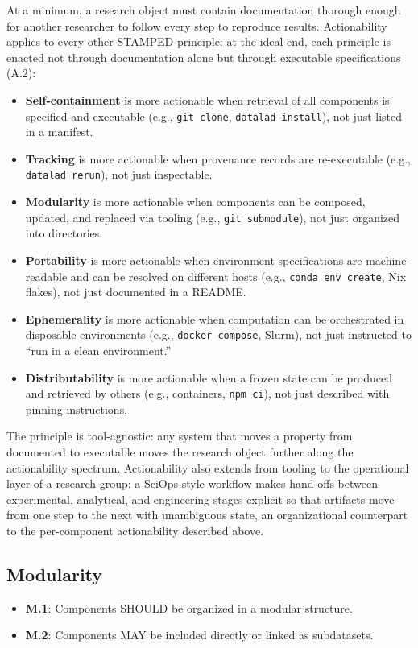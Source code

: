 \documentclass{article}
\makeatletter
\newcommand{\hyanchor}[1]{\texorpdfstring{\Hy@raisedlink{\hypertarget{#1}{}}}{}}
\newcommand{\anchoredsubsection}[2]{\subsection[#2]{\hyanchor{#1}#2}}
\makeatother
\begin{document}
At a minimum, a research object must contain documentation thorough enough for another researcher to follow every step to reproduce results.
Actionability applies to every other STAMPED principle: at the ideal end, each principle is enacted not through documentation alone but through executable specifications (A.2):
\begin{itemize}
  \item \textbf{Self-containment} is more actionable when retrieval of all components is specified and executable (e.g., \texttt{git clone}, \texttt{datalad install}), not just listed in a manifest.
  \item \textbf{Tracking} is more actionable when provenance records are re-executable (e.g., \texttt{datalad rerun}), not just inspectable.
  \item \textbf{Modularity} is more actionable when components can be composed, updated, and replaced via tooling (e.g., \texttt{git submodule}), not just organized into directories.
  \item \textbf{Portability} is more actionable when environment specifications are machine-readable and can be resolved on different hosts (e.g., \texttt{conda env create}, Nix flakes), not just documented in a README.
  \item \textbf{Ephemerality} is more actionable when computation can be orchestrated in disposable environments (e.g., \texttt{docker compose}, Slurm), not just instructed to ``run in a clean environment.''
  \item \textbf{Distributability} is more actionable when a frozen state can be produced and retrieved by others (e.g., containers, \texttt{npm ci}), not just described with pinning instructions.
\end{itemize}
The principle is tool-agnostic: any system that moves a property from documented to executable moves the research object further along the actionability spectrum.
Actionability also extends from tooling to the operational layer of a research group: a SciOps-style workflow makes hand-offs between experimental, analytical, and engineering stages explicit so that artifacts move from one step to the next with unambiguous state\cite{johnson_sciops_2024}, an organizational counterpart to the per-component actionability described above.



\anchoredsubsection{modularity}{Modularity}

\begin{itemize}
    \item \textbf{M.1}: Components SHOULD be organized in a modular structure.
    \item \textbf{M.2}: Components MAY be included directly or linked as subdatasets.
\end{itemize}
\end{document}

